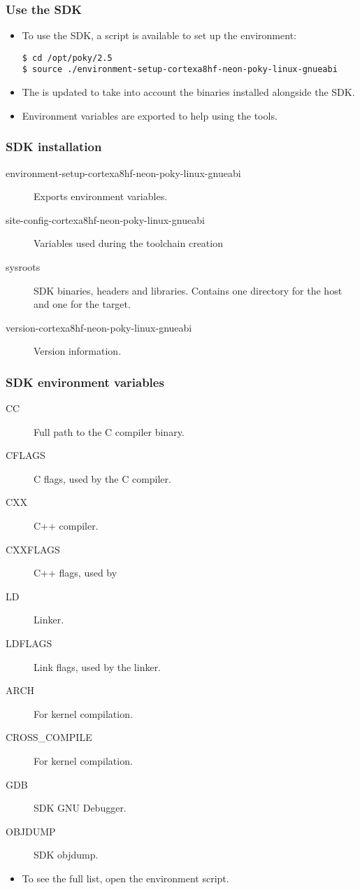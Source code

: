 \begin{frame}[fragile]
  \frametitle{Use the SDK}
  \begin{itemize}
    \item To use the SDK, a script is available to set up the
      environment:
      \begin{block}{}
        \begin{verbatim}
$ cd /opt/poky/2.5
$ source ./environment-setup-cortexa8hf-neon-poky-linux-gnueabi
        \end{verbatim}
      \end{block}
    \item The  is updated to take into account the binaries
      installed alongside the SDK.
    \item Environment variables are exported to help using the tools.
  \end{itemize}
\end{frame}

\begin{frame}
  \frametitle{SDK installation}
  \begin{description}
    \item[environment-setup-cortexa8hf-neon-poky-linux-gnueabi] Exports environment
      variables.
    \item[site-config-cortexa8hf-neon-poky-linux-gnueabi] Variables used during the
      toolchain creation
    \item[sysroots] SDK binaries, headers and libraries. Contains
      one directory for the host and one for the target.
    \item[version-cortexa8hf-neon-poky-linux-gnueabi] Version information.
  \end{description}
\end{frame}

\begin{frame}
  \frametitle{SDK environment variables}
  \begin{description}
    \item[CC] Full path to the C compiler binary.
    \item[CFLAGS] C flags, used by the C compiler.
    \item[CXX] C++ compiler.
    \item[CXXFLAGS] C++ flags, used by 
    \item[LD] Linker.
    \item[LDFLAGS] Link flags, used by the linker.
    \item[ARCH] For kernel compilation.
    \item[CROSS\_COMPILE] For kernel compilation.
    \item[GDB] SDK GNU Debugger.
    \item[OBJDUMP] SDK objdump.
  \end{description}
  \begin{itemize}
    \item To see the full list, open the environment script.
  \end{itemize}
\end{frame}

